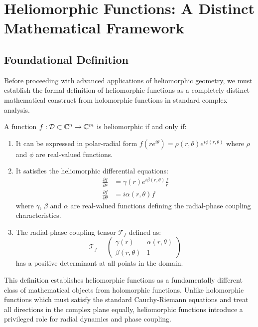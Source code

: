 \chapter{Heliomorphic Functions: A Distinct Mathematical Framework}

\section{Foundational Definition}

Before proceeding with advanced applications of heliomorphic geometry, we must establish the formal definition of heliomorphic functions as a completely distinct mathematical construct from holomorphic functions in standard complex analysis.

\begin{definition}
A function $f: \mathcal{D} \subset \mathbb{C}^n \rightarrow \mathbb{C}^m$ is heliomorphic if and only if:
\begin{enumerate}
    \item It can be expressed in polar-radial form $f(re^{i\theta}) = \rho(r,\theta)e^{i\phi(r,\theta)}$ where $\rho$ and $\phi$ are real-valued functions.
    
    \item It satisfies the heliomorphic differential equations:
    \begin{align}
        \frac{\partial f}{\partial r} &= \gamma(r)e^{i\beta(r,\theta)}\frac{f}{r}\\
        \frac{\partial f}{\partial \theta} &= i\alpha(r,\theta)f
    \end{align}
    where $\gamma$, $\beta$ and $\alpha$ are real-valued functions defining the radial-phase coupling characteristics.
    
    \item The radial-phase coupling tensor $\mathcal{T}_f$ defined as:
    \begin{equation}
        \mathcal{T}_f = \begin{pmatrix}
            \gamma(r) & \alpha(r,\theta)\\
            \beta(r,\theta) & 1
        \end{pmatrix}
    \end{equation}
    has a positive determinant at all points in the domain.
\end{enumerate}
\end{definition}

This definition establishes heliomorphic functions as a fundamentally different class of mathematical objects from holomorphic functions. Unlike holomorphic functions which must satisfy the standard Cauchy-Riemann equations and treat all directions in the complex plane equally, heliomorphic functions introduce a privileged role for radial dynamics and phase coupling.

